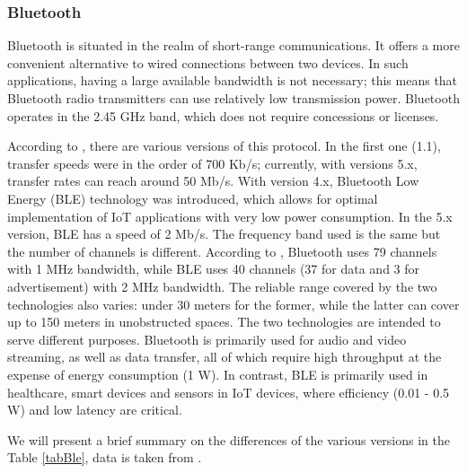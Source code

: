 \documentclass[english]{article}
\newcounter{subsubsubsection}[subsubsection]
\begin{document}
\subsubsection{Bluetooth}
Bluetooth is situated in the realm of short-range communications. It offers a more convenient alternative to wired connections between two devices. In such applications, having a large available bandwidth is not necessary; this means that Bluetooth radio transmitters can use relatively low transmission power. Bluetooth operates in the 2.45 GHz band, which does not require concessions or licenses.

According to \cite{Transmission}, there are various versions of this protocol. In the first one (1.1), transfer speeds were in the order of 700 Kb/s; currently, with versions 5.x, transfer rates can reach around 50 Mb/s. With version 4.x, Bluetooth Low Energy (BLE) technology was introduced, which allows for optimal implementation of IoT applications with very low power consumption. In the 5.x version, BLE has a speed of 2 Mb/s. The frequency band used is the same but the number of channels is different. According to \cite{blee}, Bluetooth uses 79 channels with 1 MHz bandwidth, while BLE uses 40 channels (37 for data and 3 for advertisement) with 2 MHz bandwidth. The reliable range covered by the two technologies also varies: under 30 meters for the former, while the latter can cover up to 150 meters in unobstructed spaces.
The two technologies are intended to serve different purposes. Bluetooth is primarily used for audio and video streaming, as well as data transfer, all of which require high throughput at the expense of energy consumption (1 W). In contrast, BLE is primarily used in healthcare, smart devices and sensors in IoT devices, where efficiency (0.01 - 0.5 W) and low latency are critical.

We will present a brief summary on the differences of the various versions in the Table \ref{tabBle}, data is taken from \cite{G_2023,matlab}.
\end{document}
